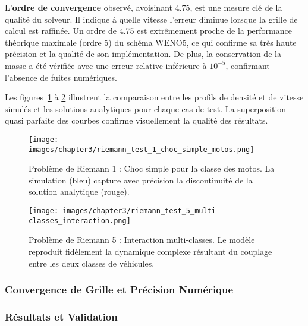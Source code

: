 L'\textbf{ordre de convergence} observé, avoisinant 4.75, est une mesure clé de la qualité du solveur. Il indique à quelle vitesse l'erreur diminue lorsque la grille de calcul est raffinée. Un ordre de 4.75 est extrêmement proche de la performance théorique maximale (ordre 5) du schéma WENO5, ce qui confirme sa très haute précision et la qualité de son implémentation. De plus, la conservation de la masse a été vérifiée avec une erreur relative inférieure à $10^{-5}$, confirmant l'absence de fuites numériques.

Les figures~\ref{fig:riemann_choc_simple} à \ref{fig:riemann_interaction_multiclasse} illustrent la comparaison entre les profils de densité et de vitesse simulés et les solutions analytiques pour chaque cas de test. La superposition quasi parfaite des courbes confirme visuellement la qualité des résultats.

\begin{figure}[htbp]
    \centering
    \texttt{[image: images/chapter3/riemann\_test\_1\_choc\_simple\_motos.png]}
    \caption{Problème de Riemann 1 : Choc simple pour la classe des motos. La simulation (bleu) capture avec précision la discontinuité de la solution analytique (rouge).}
    \label{fig:riemann_choc_simple}
\end{figure}

\begin{figure}[htbp]
    \centering
    \texttt{[image: images/chapter3/riemann\_test\_5\_multi-classes\_interaction.png]}
    \caption{Problème de Riemann 5 : Interaction multi-classes. Le modèle reproduit fidèlement la dynamique complexe résultant du couplage entre les deux classes de véhicules.}
    \label{fig:riemann_interaction_multiclasse}
\end{figure}


\subsubsection{Convergence de Grille et Précision Numérique}
\label{subsec:convergence_grille}

\subsubsection{Résultats et Validation}
\label{subsec:resultats_segment}

